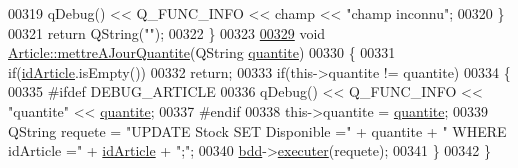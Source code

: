 \begin{DoxyCode}
00319             qDebug() << Q\_FUNC\_INFO << champ << \textcolor{stringliteral}{"champ inconnu"};
00320     \}
00321     \textcolor{keywordflow}{return} QString(\textcolor{stringliteral}{""});
00322 \}
00323 
\hyperlink{class_article_a5777f36d74974ff21e712a9875c2d8bf}{00329} \textcolor{keywordtype}{void} \hyperlink{class_article_a5777f36d74974ff21e712a9875c2d8bf}{Article::mettreAJourQuantite}(QString \hyperlink{class_article_a0870104453080b43bc271346217a864b}{quantite})
00330 \{
00331     \textcolor{keywordflow}{if}(\hyperlink{class_article_a9f2f7a04139f26accec145066a5aacae}{idArticle}.isEmpty())
00332         \textcolor{keywordflow}{return};
00333     \textcolor{keywordflow}{if}(this->quantite != quantite)
00334     \{
00335 \textcolor{preprocessor}{        #ifdef DEBUG\_ARTICLE}
00336             qDebug() << Q\_FUNC\_INFO << \textcolor{stringliteral}{"quantite"} << \hyperlink{class_article_a0870104453080b43bc271346217a864b}{quantite};
00337 \textcolor{preprocessor}{        #endif}
00338         this->quantite = \hyperlink{class_article_a0870104453080b43bc271346217a864b}{quantite};
00339         QString requete = \textcolor{stringliteral}{"UPDATE Stock SET Disponible ="} + quantite + \textcolor{stringliteral}{" WHERE idArticle ="} + 
      \hyperlink{class_article_a9f2f7a04139f26accec145066a5aacae}{idArticle} + \textcolor{stringliteral}{";"};
00340         \hyperlink{class_article_a7221cec4212d86d74f479b9ee683ee8a}{bdd}->\hyperlink{class_bdd_ab6ae645b4b54ce5df8dc9b422fb39faa}{executer}(requete);
00341     \}
00342 \}
\end{DoxyCode}
